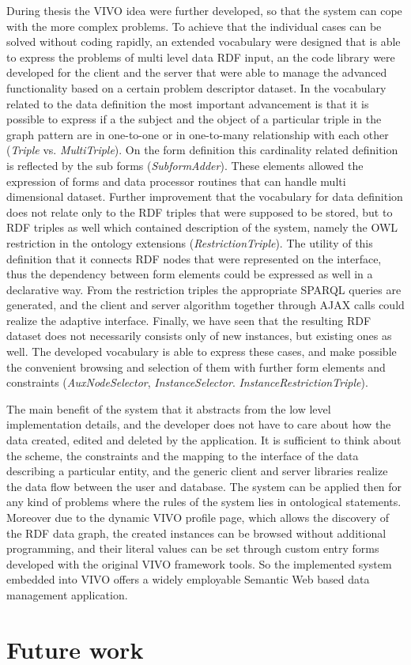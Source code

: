 During thesis the VIVO idea were further developed, so that the system can cope with the more complex problems. To achieve that the individual cases can be solved without coding rapidly, an extended vocabulary were designed that is able to express the problems of multi level data RDF input, an the code library were developed for the client and the server that were able to manage the advanced functionality based on a certain problem descriptor dataset. In the vocabulary related to the data definition the most important advancement is that it is possible to express if a the subject and the object of a particular triple in the graph pattern are in one-to-one or in one-to-many relationship with each other (\textit{Triple} vs. \textit{MultiTriple}). On the form definition this cardinality related definition is reflected by the sub forms (\textit{SubformAdder}). These elements allowed the expression of forms and data processor routines that can handle multi dimensional dataset. Further improvement that the vocabulary for data definition does not relate only to the RDF triples that were supposed to be stored, but to RDF triples as well which contained description of the system, namely the OWL restriction in the ontology extensions (\textit{RestrictionTriple}). The utility of this definition that it connects RDF nodes that were represented on the interface, thus the dependency between form elements could be expressed as well in a declarative way. From the restriction triples the appropriate SPARQL queries are generated, and the client and server algorithm together through AJAX calls could realize the adaptive interface. Finally, we have seen that the resulting RDF dataset does not necessarily consists only of new instances, but existing ones as well. The developed vocabulary is able to express these cases, and make possible the convenient browsing and selection of them with further form elements and constraints (\textit{AuxNodeSelector}, \textit{InstanceSelector}. \textit{InstanceRestrictionTriple}). 

The main benefit of the system that it abstracts from the low level implementation details, and the developer does not have to care about how the data created, edited and deleted by the application. It is sufficient to think about the scheme, the constraints and the mapping to the interface of the data describing a particular entity, and the generic client and server libraries realize the data flow between the user and database. The system can be applied then for any kind of problems where the rules of the system lies in ontological statements. Moreover due to the dynamic VIVO profile page, which allows the discovery of the RDF data graph, the created instances can be browsed without additional programming, and their literal values can be set through custom entry forms developed with the original VIVO framework tools. So the implemented system embedded into VIVO offers a widely employable Semantic Web based data management application.

\section{Future work}



